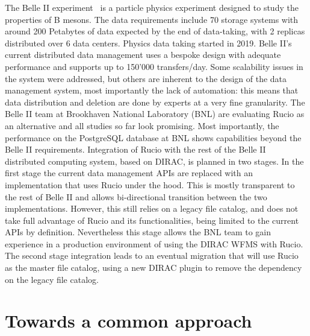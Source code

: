 \documentclass[11pt]{article}
\begin{document}
The Belle II experiment~\cite{belleii} is a particle physics experiment designed to study the properties of B mesons. The data requirements include 70 storage systems with around 200 Petabytes of data expected by the end of data-taking, with 2 replicas distributed over 6 data centers. Physics data taking started in 2019. Belle II's current distributed data management uses a bespoke design with adequate performance and supports up to 150'000 transfers/day. Some scalability issues in the system were addressed, but others are inherent to the design of the data management system, most importantly the lack of automation: this means that data distribution and deletion are done by experts at a very fine granularity. The Belle II team at Brookhaven National Laboratory (BNL) are evaluating Rucio as an alternative and all studies so far look promising. Most importantly, the performance on the PostgreSQL database at BNL shows capabilities beyond the Belle II requirements. Integration of Rucio with the rest of the Belle II distributed computing system, based on DIRAC, is planned in two stages. In the first stage the current data management APIs are replaced with an implementation that uses Rucio under the hood. This is mostly transparent to the rest of Belle II and allows bi-directional transition between the two implementations. However, this still relies on a legacy file catalog, and does not take full advantage of Rucio and its functionalities, being limited to the current APIs by definition. Nevertheless this stage allows the BNL team to gain experience in a production environment of using the DIRAC WFMS with Rucio. The second stage integration leads to an eventual migration that will use Rucio as the master file catalog, using a new DIRAC plugin to remove the dependency on the legacy file catalog.

\section{Towards a common approach }
\label{sec:common}
\end{document}
